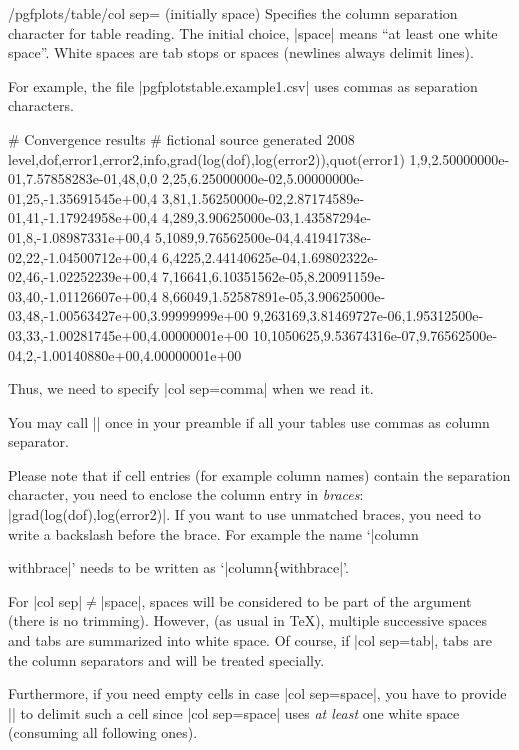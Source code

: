 \begin{key}{/pgfplots/table/col sep= (initially space)}
	Specifies the column separation character for table reading. The initial choice, |space| means ``at least one white space''. White spaces are tab stops or spaces (newlines always delimit lines).

	For example, the file |pgfplotstable.example1.csv| uses commas as separation characters.
\begin{codeexample}
# Convergence results
# fictional source  generated 2008
level,dof,error1,error2,info,{grad(log(dof),log(error2))},quot(error1)
1,9,2.50000000e-01,7.57858283e-01,48,0,0
2,25,6.25000000e-02,5.00000000e-01,25,-1.35691545e+00,4
3,81,1.56250000e-02,2.87174589e-01,41,-1.17924958e+00,4
4,289,3.90625000e-03,1.43587294e-01,8,-1.08987331e+00,4
5,1089,9.76562500e-04,4.41941738e-02,22,-1.04500712e+00,4
6,4225,2.44140625e-04,1.69802322e-02,46,-1.02252239e+00,4
7,16641,6.10351562e-05,8.20091159e-03,40,-1.01126607e+00,4
8,66049,1.52587891e-05,3.90625000e-03,48,-1.00563427e+00,3.99999999e+00
9,263169,3.81469727e-06,1.95312500e-03,33,-1.00281745e+00,4.00000001e+00
10,1050625,9.53674316e-07,9.76562500e-04,2,-1.00140880e+00,4.00000001e+00
\end{codeexample}
	Thus, we need to specify |col sep=comma| when we read it.
\begin{codeexample}[]
\end{codeexample}
	You may call || once in your preamble if all your tables use commas as column separator.

	Please note that if cell entries (for example column names) contain the separation character, you need to enclose the column entry in \emph{braces}: |{grad(log(dof),log(error2)}|. If you want to use unmatched braces, you need to write a backslash before the brace. For example the name `|column{withbrace|' needs to be written as `|column\{withbrace|'. 

	For |col sep|$\neq$|space|, spaces will be considered to be part of the argument (there is no trimming). However, (as usual in \TeX), multiple successive spaces and tabs are summarized into white space. Of course, if |col sep=tab|, tabs are the column separators and will be treated specially.
	
	Furthermore, if you need empty cells in case |col sep=space|, you have to provide |{}| to delimit such a cell since |col sep=space| uses \emph{at least} one white space (consuming all following ones).

}
\end{key}
